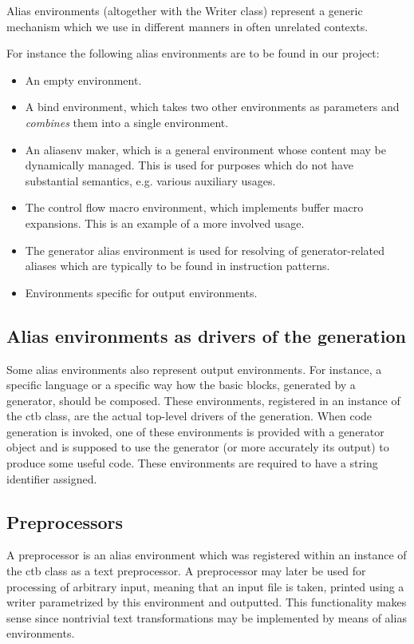 Alias environments (altogether with the Writer class) represent a generic mechanism which we use in different manners in often unrelated contexts.

For instance the following alias environments are to be found in our project:
\begin{itemize}
  \item An empty environment.
  \item A bind environment, which takes two other environments as parameters and \emph{combines} them into a single environment.
  \item An aliasenv maker, which is a general environment whose content may be dynamically managed. This is used for purposes which do not have substantial semantics, e.g. various auxiliary usages. 
  \item The control flow macro environment, which implements buffer macro expansions. This is an example of a more involved usage.
  \item The generator alias environment is used for resolving of generator-related aliases which are typically to be found in instruction patterns.
  \item Environments specific for output environments.
\end{itemize}

\subsection*{Alias environments as drivers of the generation}
  Some alias environments also represent output environments. For instance, a specific language or a specific way how the basic blocks, generated by a generator, should be composed. These environments, registered in an instance of the ctb class, are the actual top-level drivers of the generation. When code generation is invoked, one of these environments is provided with a generator object and is supposed to use the generator (or more accurately its output) to produce some useful code. These environments are required to have a string identifier assigned.

\subsection*{Preprocessors}
  A preprocessor is an alias environment which was registered within an instance of the ctb class as a text preprocessor. A preprocessor may later be used for processing of arbitrary input, meaning that an input file is taken, printed using a writer parametrized by this environment and outputted. This functionality makes sense since nontrivial text transformations may be implemented by means of alias environments.

